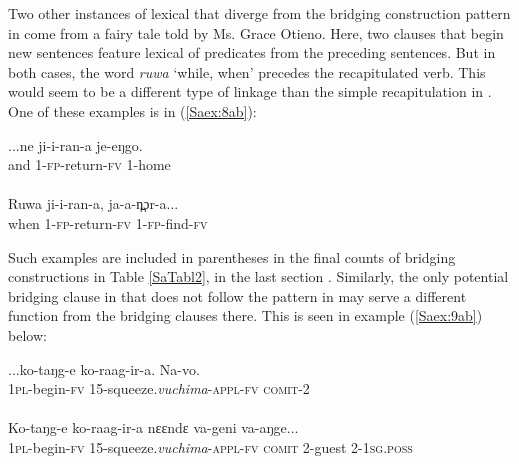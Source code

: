 \documentclass[output=paper]{LSP/langsci}
\begin{document}
Two other instances of lexical  that diverge from the bridging construction pattern in  come from a fairy tale told by Ms. Grace Otieno. Here, two clauses that begin new  sentences feature lexical  of predicates from the preceding sentences. But in both cases, the word \textit{ruwa} `while, when' precedes the recapitulated verb. This would seem to be a different type of linkage than the simple recapitulation in . One of these examples is in (\ref{Saex:8ab}):
 
\begin{exe}
\ex \label{Saex:8ab}
\begin{xlist}
\ex \label{Saex:8a}
\gll ...ne  ji-i-ran-a  je-eŋgo. \\
and  1-\textsc{fp}{}-return-\textsc{fv}  1-home\\
\glt {}\\
\ex \label{Saex:8b}
\gll Ruwa  ji-i-ran-a,  ja-a-n̪ɔr-a...\\     	       
   when  1-\textsc{fp}{}-return-\textsc{fv}  1-\textsc{fp}{}-find-\textsc{fv}\\
\glt {} 
\end{xlist}
\end{exe}

Such examples are included in parentheses in the final counts of bridging constructions in Table \ref{SaTabl2}, in the last section . Similarly, the only potential bridging clause in \citet{Chesi2014} that does not follow the pattern in  may serve a different function from the bridging clauses there. This is seen in example (\ref{Saex:9ab}) below:

\begin{exe}
\ex \label{Saex:9ab}
\begin{xlist}
\ex \label{Saex:9a}
\gll ...ko-taŋg-e ko-raag-ir-a. Na-vo. \\
1\textsc{pl}-begin-\textsc{fv} 15-squeeze.\textit{vuchima}-\textsc{appl-fv} \textsc{comit-2}\\
\glt {}\\
\ex \label{Saex:9b}
\gll Ko-taŋg-e ko-raag-ir-a nɛɛndɛ va-geni va-aŋge...\\     	       
   \textsc{1pl-}begin-\textsc{fv} 15-squeeze.\textit{vuchima}-\textsc{appl-fv} \textsc{comit} 2-guest 2-\textsc{1sg.poss}\\
\glt {} 
\end{xlist}
\end{exe}
\end{document}
